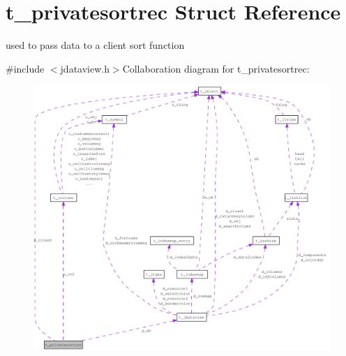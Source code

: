 \hypertarget{structt__privatesortrec}{
\section{t\_\-privatesortrec Struct Reference}
\label{structt__privatesortrec}
}


used to pass data to a client sort function  


{\ttfamily \#include $<$jdataview.h$>$}Collaboration diagram for t\_\-privatesortrec:\nopagebreak
\begin{figure}[H]
\begin{center}
\leavevmode
\includegraphics[width=400pt]{structt__privatesortrec__coll__graph}
\end{center}
\end{figure}

